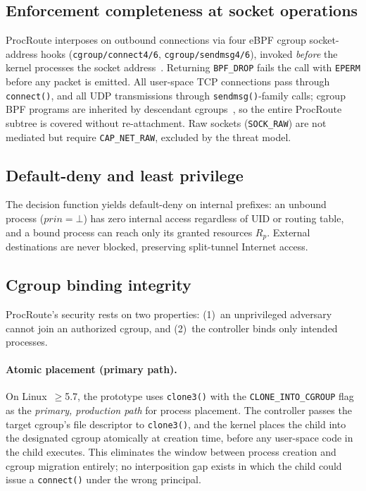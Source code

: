 \documentclass[sigconf]{acmart}
\begin{document}
\subsection{Enforcement completeness at socket operations}

ProcRoute interposes on outbound connections via four eBPF
cgroup socket-address hooks (\texttt{cgroup/connect4/6},
\texttt{cgroup/sendmsg4/6}), invoked \emph{before} the kernel
processes the socket address~\cite{kernel_bpf_cgroup}.
Returning \texttt{BPF\_DROP} fails the call with \texttt{EPERM}
before any packet is emitted.
All user-space TCP connections pass through \texttt{connect()},
and all UDP transmissions through \texttt{sendmsg()}-family calls;
cgroup BPF programs are inherited by descendant
cgroups~\cite{kernel_cgroup2}, so the entire ProcRoute subtree
is covered without re-attachment.
Raw sockets (\texttt{SOCK\_RAW}) are not mediated but require
\texttt{CAP\_NET\_\allowbreak RAW}, excluded by the threat model.

\subsection{Default-deny and least privilege}

The decision function yields
default-deny on internal prefixes: an unbound process
($\mathit{prin} = \bot$) has zero internal access regardless of
UID or routing table, and a bound process can reach only its
granted resources $R_p$.
External destinations are never blocked, preserving split-tunnel
Internet access.

\subsection{Cgroup binding integrity}
\label{sec:cgroup-integrity}

ProcRoute's security rests on two properties:
(1)~an unprivileged adversary cannot join an authorized cgroup,
and (2)~the controller binds only intended processes.

\paragraph{Atomic placement (primary path).}
On Linux~$\geq$5.7, the prototype uses \texttt{clone3()} with the
\texttt{CLONE\_INTO\_CGROUP} flag as the \emph{primary, production
path} for process placement.
The controller passes the target cgroup's file descriptor to
\texttt{clone3()}, and the kernel places the child into the
designated cgroup atomically at creation time, before any
user-space code in the child executes.
This eliminates the window between process creation and cgroup
migration entirely; no interposition gap exists in which the child
could issue a \texttt{connect()} under the wrong principal.
\end{document}
